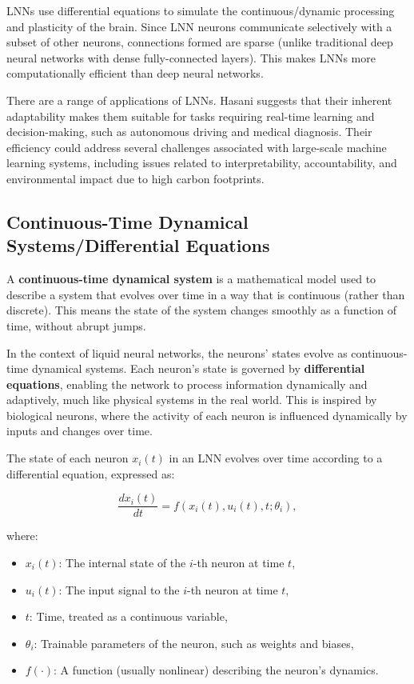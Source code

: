 LNNs use differential equations to simulate the continuous/dynamic processing and plasticity of the brain. Since LNN neurons communicate selectively with a subset of other neurons, connections formed are sparse (unlike traditional deep neural networks with dense fully-connected layers). This makes LNNs more computationally efficient than deep neural networks.

There are a range of applications of LNNs. Hasani suggests that their inherent adaptability makes them suitable for tasks requiring real-time learning and decision-making, such as autonomous driving and medical diagnosis. Their efficiency could address several challenges associated with large-scale machine learning systems, including issues related to interpretability, accountability, and environmental impact due to high carbon footprints. \cite{tedxtalksLiquidNeuralNetworks2023}

\subsection*{Continuous-Time Dynamical Systems/Differential Equations}

A \textbf{continuous-time dynamical system} is a mathematical model used to describe a system that evolves over time in a way that is continuous (rather than discrete). This means the state of the system changes smoothly as a function of time, without abrupt jumps.

In the context of liquid neural networks, the neurons' states evolve as continuous-time dynamical systems. Each neuron's state is governed by \textbf{differential equations}, enabling the network to process information dynamically and adaptively, much like physical systems in the real world. This is inspired by biological neurons, where the activity of each neuron is influenced dynamically by inputs and changes over time.

The state of each neuron \(x_i(t)\) in an LNN evolves over time according to a differential equation, expressed as:

\begin{equation} \label{eq:1}
    \frac{dx_i(t)}{dt} = f(x_i(t), u_i(t), t; \theta_i),
    \end{equation}

where:
\begin{itemize}
    \item \(x_i(t)\): The internal state of the \(i\)-th neuron at time \(t\),
    \item \(u_i(t)\): The input signal to the \(i\)-th neuron at time \(t\),
    \item \(t\): Time, treated as a continuous variable,
    \item \(\theta_i\): Trainable parameters of the neuron, such as weights and biases,
    \item \(f(\cdot)\): A function (usually nonlinear) describing the neuron’s dynamics.
\end{itemize}

